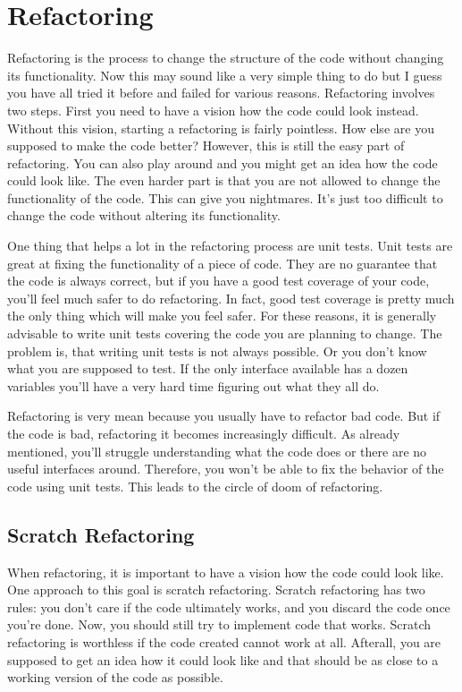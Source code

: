 \chapter{Refactoring}

Refactoring is the process to change the structure of the code without changing its functionality. Now this may sound like a very simple thing to do but I guess you have all tried it before and failed for various reasons. Refactoring involves two steps. First you need to have a vision how the code could look instead. Without this vision, starting a refactoring is fairly pointless. How else are you supposed to make the code better? However, this is still the easy part of refactoring. You can also play around and you might get an idea how the code could look like. The even harder part is that you are not allowed to change the functionality of the code. This can give you nightmares. It's just too difficult to change the code without altering its functionality.

One thing that helps a lot in the refactoring process are unit tests. Unit tests are great at fixing the functionality of a piece of code. They are no guarantee that the code is always correct, but if you have a good test coverage of your code, you'll feel much safer to do refactoring. In fact, good test coverage is pretty much the only thing which will make you feel safer. For these reasons, it is generally advisable to write unit tests covering the code you are planning to change. The problem is, that writing unit tests is not always possible. Or you don't know what you are supposed to test. If the only interface available has a dozen variables you'll have a very hard time figuring out what they all do.

Refactoring is very mean because you usually have to refactor bad code. But if the code is bad, refactoring it becomes increasingly difficult. As already mentioned, you'll struggle understanding what the code does or there are no useful interfaces around. Therefore, you won't be able to fix the behavior of the code using unit tests. This leads to the circle of doom of refactoring.

\section{Scratch Refactoring}

When refactoring, it is important to have a vision how the code could look like. One approach to this goal is scratch refactoring. Scratch refactoring has two rules: you don't care if the code ultimately works, and you discard the code once you're done. Now, you should still try to implement code that works. Scratch refactoring is worthless if the code created cannot work at all. Afterall, you are supposed to get an idea how it could look like and that should be as close to a working version of the code as possible.

